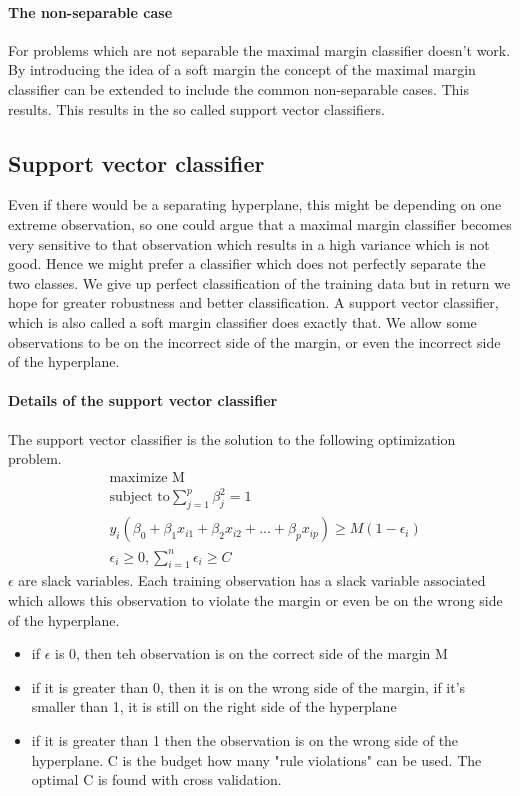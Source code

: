 \documentclass[../document.tex]{subfiles}
\begin{document}
	\paragraph{The non-separable case}
	For problems which are not separable the maximal margin classifier doesn't work. By introducing the idea of a soft margin the concept of the maximal margin classifier can be extended to include the common non-separable cases. This results. This results in the so called support vector classifiers.
	\subsection{Support vector classifier}
	Even if there would be a separating hyperplane, this might be depending on one extreme observation, so one could argue that a maximal margin classifier becomes very sensitive to that observation which results in a high variance which is not good. Hence we might prefer a classifier which does not perfectly separate the two classes. We give up perfect classification of the training data but in return we hope for greater robustness and better classification. A support vector classifier, which is also called a soft margin classifier does exactly that. We allow some observations to be on the incorrect side of the margin, or even the incorrect side of the hyperplane.
	\paragraph{Details of the support vector classifier}
	The support vector classifier is the solution to the following optimization problem.
	\begin{equation}
	\begin{split}
		&\text{maximize M}\\
		&\text{subject to}\sum_{j=1}^{p}\beta_{j}^2=1\\
		&y_{i}(\beta_{0}+\beta_{1}x_{i1}+\beta_{2}x_{i2}+...+\beta_{p}x_{ip})\ge M(1-\epsilon_{i})\\
		&\epsilon_{i}\ge 0, \sum_{i=1}^{n}\epsilon_{i}\ge C
	\end{split}
	\end{equation}
	\(\epsilon\) are slack variables. Each training observation has a slack variable associated which allows this observation to violate the margin or even be on the wrong side of the hyperplane.
	\begin{itemize}
		\item if \(\epsilon\) is 0, then teh observation is on the correct side of the margin M
		\item if it is greater than 0, then it is on the wrong side of the margin, if it's smaller than 1, it is still on the right side of the hyperplane
		\item if it is greater than 1 then the observation is on the wrong side of the hyperplane. C is the budget how many "rule violations" can be used. The optimal C is found with cross validation.
	\end{itemize}
\end{document}
